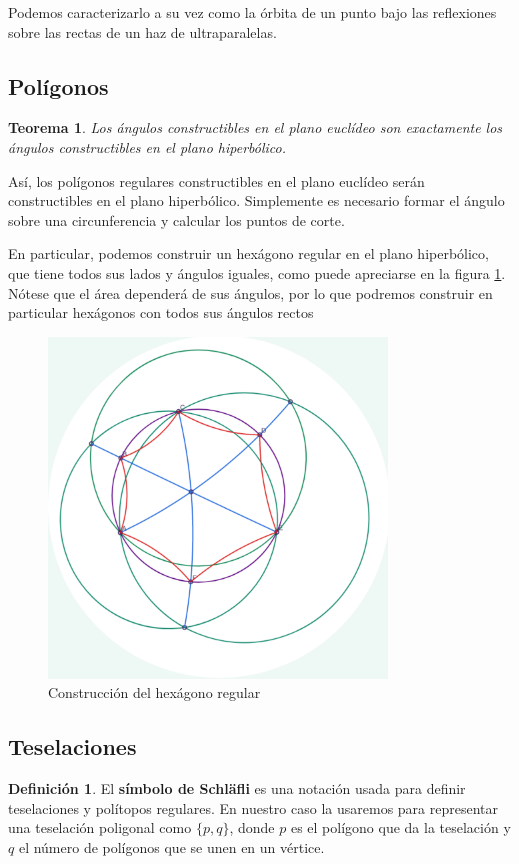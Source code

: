 \documentclass{article}
\theoremstyle{plain}
\newtheorem{theorem}{Teorema}
\theoremstyle{definition}
\newtheorem{definition}{Definición}
\theoremstyle{remark}
\begin{document}
Podemos caracterizarlo a su vez como la órbita de un punto bajo las reflexiones
sobre las rectas de un haz de ultraparalelas.\cite{coxeter}



\subsection{Polígonos}
\begin{theorem}
  Los ángulos constructibles en el plano euclídeo son exactamente los ángulos
  constructibles en el plano hiperbólico. \cite{jagy95}
\end{theorem}

Así, los polígonos regulares constructibles en el plano euclídeo serán
constructibles en el plano hiperbólico. Simplemente es necesario
formar el ángulo sobre una circunferencia y calcular los puntos de corte.

En particular, podemos construir un hexágono regular en el plano
hiperbólico, que tiene todos sus lados y ángulos iguales, como puede
apreciarse en la figura \ref{hexagon}. Nótese que el área dependerá de
sus ángulos, por lo que podremos construir en particular hexágonos con
todos sus ángulos rectos

\begin{figure}[ht!]
\centering
\includegraphics[width=90mm]{./hexagon.png}
\caption{Construcción del hexágono regular \label{hexagon}}
\end{figure}

\subsection{Teselaciones}
\begin{definition}
  El \textbf{símbolo de Schläfli} es una notación usada para definir
  teselaciones y polítopos regulares. En nuestro caso la usaremos para
  representar una teselación poligonal como $\{p,q\}$, donde $p$ es el
  polígono que da la teselación y $q$ el número de polígonos que se unen
  en un vértice.
\end{definition}
\end{document}
